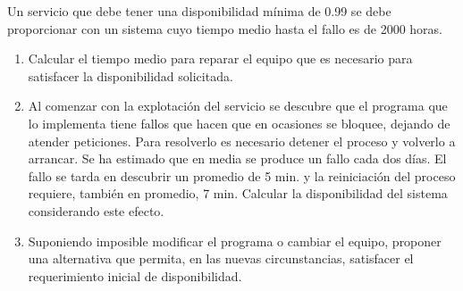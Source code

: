 \begin{problem}[6]
Un  servicio que debe tener una disponibilidad mínima de 0.99
se debe proporcionar con un sistema cuyo tiempo medio hasta el fallo es de
 2000 horas.
\begin{enumerate}
	\item Calcular el tiempo medio para reparar el equipo que es necesario para satisfacer la disponibilidad solicitada.
	\item Al comenzar con la explotación del servicio se descubre que el
programa que lo implementa tiene fallos que hacen que en ocasiones se
bloquee, dejando de atender peticiones. Para resolverlo es necesario
detener el proceso y volverlo a arrancar. Se ha estimado que en media se
 produce un fallo cada dos días. El fallo se tarda en descubrir un
promedio de 5 min. y la reiniciación del proceso requiere, también en
promedio, 7 min. Calcular la disponibilidad del sistema considerando este
 efecto.
	\item Suponiendo imposible modificar el programa o cambiar el equipo,
proponer una alternativa que permita, en las nuevas circunstancias,
satisfacer el requerimiento inicial de disponibilidad.
\end{enumerate}

\solution



\end{problem}

